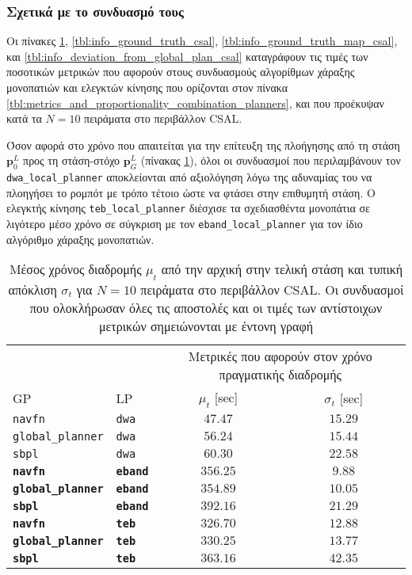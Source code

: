 \subsubsection{Σχετικά με το συνδυασμό τους}

Οι πίνακες \ref{tbl:info_pose_csal}, \ref{tbl:info_ground_truth_csal},
\ref{tbl:info_ground_truth_map_csal}, και
\ref{tbl:info_deviation_from_global_plan_csal} καταγράφουν τις τιμές των
ποσοτικών μετρικών που αφορούν στους συνδυασμούς αλγορίθμων χάραξης μονοπατιών
και ελεγκτών κίνησης που ορίζονται στον πίνακα
\ref{tbl:metrics_and_proportionality_combination_planners}, και που προέκυψαν
κατά τα $N = 10$ πειράματα στο περιβάλλον CSAL.

Όσον αφορά στο χρόνο που απαιτείται για την επίτευξη της πλοήγησης από τη στάση
$\bm{p}_0^L$ προς τη στάση-στόχο $\bm{p}_G^L$ (πίνακας
\ref{tbl:info_pose_csal}), όλοι οι συνδυασμοί που περιλαμβάνουν τον
\texttt{dwa\_local\_planner} αποκλείονται από αξιολόγηση λόγω της αδυναμίας
του να πλοηγήσει το ρομπότ με τρόπο τέτοιο ώστε να φτάσει στην επιθυμητή στάση.
Ο ελεγκτής κίνησης \texttt{teb\_local\_planner} διέσχισε τα σχεδιασθέντα
μονοπάτια σε λιγότερο μέσο χρόνο σε σύγκριση με τον
\texttt{eband\_local\_planner} για τον ίδιο αλγόριθμο χάραξης μονοπατιών.

\begin{table}[h]
\renewcommand{\arraystretch}{1.3}
\begin{tabular}{llcc}
& & \multicolumn{2}{c}{Μετρικές που αφορούν στον χρόνο πραγματικής διαδρομής} \\
\cline{3-4}
GP & LP & $\mu_{t}$ [sec] & $\sigma_{t}$ [sec] \\  \toprule
\texttt{navfn} & \texttt{dwa} & $47.47$ & $15.29$ \\
\texttt{global\_planner} & \texttt{dwa} & $56.24$ & $15.44$ \\
\texttt{sbpl} & \texttt{dwa} & $60.30$ & $22.58$ \\
  \textbf{\texttt{navfn}} & \textbf{\texttt{eband}} & $\bm{356.25}$ & $\bm{9.88}$ \\
  \textbf{\texttt{global\_planner}} & \textbf{\texttt{eband}} & $\bm{354.89}$ & $\bm{10.05}$ \\
  \textbf{\texttt{sbpl}} & \textbf{\texttt{eband}} & $\bm{392.16}$ & $\bm{21.29}$ \\
  \textbf{\texttt{navfn}} & \textbf{\texttt{teb}} & $\bm{326.70}$ & $\bm{12.88}$ \\
  \textbf{\texttt{global\_planner}} & \textbf{\texttt{teb}} & $\bm{330.25}$ & $\bm{13.77}$ \\
  \textbf{\texttt{sbpl}} & \textbf{\texttt{teb}} & $\bm{363.16}$ & $\bm{42.35}$ \\ \bottomrule
\end{tabular}
\caption{\small Μέσος χρόνος διαδρομής $\mu_{t}$ από την αρχική στην τελική
         στάση και τυπική απόκλιση $\sigma_{t}$ για $N=10$ πειράματα στο
         περιβάλλον CSAL. Οι συνδυασμοί που ολοκλήρωσαν όλες τις αποστολές
         και οι τιμές των αντίστοιχων μετρικών σημειώνονται με έντονη γραφή}
\label{tbl:info_pose_csal}
\end{table}

